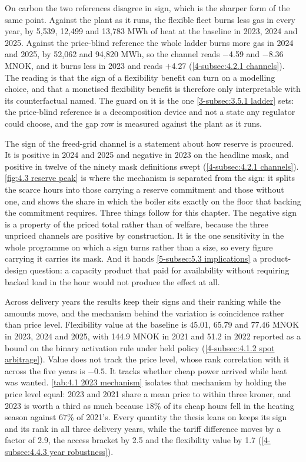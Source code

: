 On carbon the two references disagree in sign, which is the sharper form of the same point. Against the plant as it runs, the flexible fleet burns less gas in every year, by 5{,}539, 12{,}499 and 13{,}783 MWh of heat at the baseline in 2023, 2024 and 2025. Against the price-blind reference the whole ladder burns more gas in 2024 and 2025, by 52{,}062 and 94{,}820 MWh, so the channel reads $-$4.59 and $-$8.36 MNOK, and it burns less in 2023 and reads $+$4.27 (\autoref{4-subsec:4.2.1 channels}). The reading is that the sign of a flexibility benefit can turn on a modelling choice, and that a monetised flexibility benefit is therefore only interpretable with its counterfactual named. The guard on it is the one \autoref{3-subsec:3.5.1 ladder} sets: the price-blind reference is a decomposition device and not a state any regulator could choose, and the gap row is measured against the plant as it runs.

The sign of the freed-grid channel is a statement about how reserve is procured. It is positive in 2024 and 2025 and negative in 2023 on the headline mask, and positive in twelve of the ninety mask definitions swept (\autoref{4-subsec:4.2.1 channels}). \autoref{fig:4.3 reserve peak} is where the mechanism is separated from the sign: it splits the scarce hours into those carrying a reserve commitment and those without one, and shows the share in which the boiler sits exactly on the floor that backing the commitment requires. Three things follow for this chapter. The negative sign is a property of the priced total rather than of welfare, because the three unpriced channels are positive by construction. It is the one sensitivity in the whole programme on which a sign turns rather than a size, so every figure carrying it carries its mask. And it hands \autoref{5-subsec:5.3 implications} a product-design question: a capacity product that paid for availability without requiring backed load in the hour would not produce the effect at all.

Across delivery years the results keep their signs and their ranking while the amounts move, and the mechanism behind the variation is coincidence rather than price level. Flexibility value at the baseline is 45.01, 65.79 and 77.46 MNOK in 2023, 2024 and 2025, with 144.9 MNOK in 2021 and 51.2 in 2022 reported as a bound on the binary activation rule under held policy (\autoref{4-subsec:4.1.2 spot arbitrage}). Value does not track the price level, whose rank correlation with it across the five years is $-0.5$. It tracks whether cheap power arrived while heat was wanted. \autoref{tab:4.1 2023 mechanism} isolates that mechanism by holding the price level equal: 2023 and 2021 share a mean price to within three kroner, and 2023 is worth a third as much because $18\%$ of its cheap hours fell in the heating season against $67\%$ of 2021's. Every quantity the thesis leans on keeps its sign and its rank in all three delivery years, while the tariff difference moves by a factor of 2.9, the access bracket by 2.5 and the flexibility value by 1.7 (\autoref{4-subsec:4.4.3 year robustness}).

